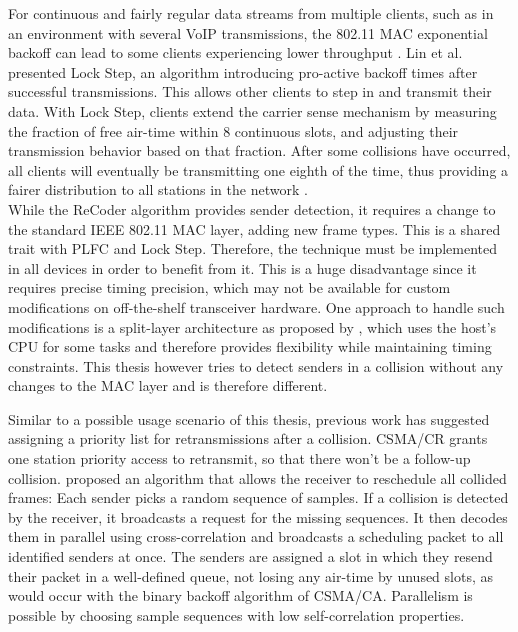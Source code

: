 For continuous and fairly regular data streams from multiple clients, such as in an environment with several VoIP transmissions, the 802.11 \gls{MAC} exponential backoff can lead to some clients experiencing lower throughput \cite{lin2009}. Lin et al. presented Lock Step, an algorithm introducing pro-active backoff times after successful transmissions. This allows other clients to step in and transmit their data. With Lock Step, clients extend the carrier sense mechanism by measuring the fraction of free air-time within 8 continuous slots, and adjusting their transmission behavior based on that fraction. After some collisions have occurred, all clients will eventually be transmitting one eighth of the time, thus providing a fairer distribution to all stations in the network \cite{lin2009}.\\

While the ReCoder algorithm provides sender detection, it requires a change to the standard IEEE 802.11 \gls{MAC} layer, adding new frame types. This is a shared trait with \gls{PLFC} and Lock Step. Therefore, the technique must be implemented in all devices in order to benefit from it. This is a huge disadvantage since it requires precise timing precision, which may not be available for custom modifications on off-the-shelf transceiver hardware. One approach to handle such modifications is a split-layer architecture as proposed by \cite{nychis2009}, which uses the host's CPU for some tasks and therefore provides flexibility while maintaining timing constraints. This thesis however tries to detect senders in a collision without any changes to the \gls{MAC} layer and is therefore different.

Similar to a possible usage scenario of this thesis, previous work has suggested assigning a priority list for retransmissions after a collision. \gls{CSMA/CR} \cite{choi2013} grants one station priority access to retransmit, so that there won't be a follow-up collision. \cite{zhao2015} proposed an algorithm that allows the receiver to reschedule all collided frames: Each sender picks a random sequence of samples. If a collision is detected by the receiver, it broadcasts a request for the missing sequences. It then decodes them in parallel using cross-correlation and broadcasts a scheduling packet to all identified senders at once. The senders are assigned a slot in which they resend their packet in a well-defined queue, not losing any air-time by unused slots, as would occur with the binary backoff algorithm of \gls{CSMA/CA}. Parallelism is possible by choosing sample sequences with low self-correlation properties.


